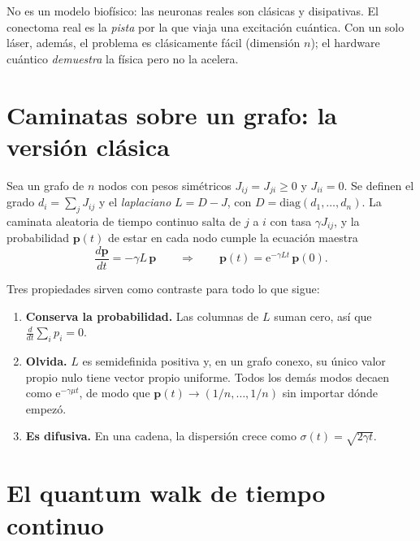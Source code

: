 \documentclass[11pt,a4paper]{article}
\newcommand{\e}{\mathrm{e}}
\theoremstyle{plain}
\theoremstyle{definition}
\theoremstyle{remark}
\begin{document}
\begin{honestidad}
No es un modelo biofísico: las neuronas reales son clásicas y disipativas. El conectoma real es la \emph{pista} por la que viaja una excitación cuántica. Con un solo láser, además, el problema es clásicamente fácil (dimensión $n$); el hardware cuántico \emph{demuestra} la física pero no la acelera.
\end{honestidad}

\section{Caminatas sobre un grafo: la versión clásica}
\label{sec:clasico}

Sea un grafo de $n$ nodos con pesos simétricos $J_{ij}=J_{ji}\ge0$ y $J_{ii}=0$. Se definen el grado $d_i=\sum_jJ_{ij}$ y el \emph{laplaciano} $L=D-J$, con $D=\mathrm{diag}(d_1,\dots,d_n)$. La caminata aleatoria de tiempo continuo salta de $j$ a $i$ con tasa $\gamma J_{ij}$, y la probabilidad $\bm p(t)$ de estar en cada nodo cumple la ecuación maestra
\begin{equation}
\frac{d\bm p}{dt}=-\gamma L\,\bm p
\qquad\Longrightarrow\qquad
\bm p(t)=\e^{-\gamma Lt}\,\bm p(0).
\label{eq:clasica}
\end{equation}

Tres propiedades sirven como contraste para todo lo que sigue:

\begin{enumerate}
\item \textbf{Conserva la probabilidad.} Las columnas de $L$ suman cero, así que $\frac{d}{dt}\sum_ip_i=0$.
\item \textbf{Olvida.} $L$ es semidefinida positiva y, en un grafo conexo, su único valor propio nulo tiene vector propio uniforme. Todos los demás modos decaen como $\e^{-\gamma\mu t}$, de modo que $\bm p(t)\to(1/n,\dots,1/n)$ sin importar dónde empezó.
\item \textbf{Es difusiva.} En una cadena, la dispersión crece como $\sigma(t)=\sqrt{2\gamma t}$.
\end{enumerate}

\section{El quantum walk de tiempo continuo}
\label{sec:ctqw}
\end{document}
